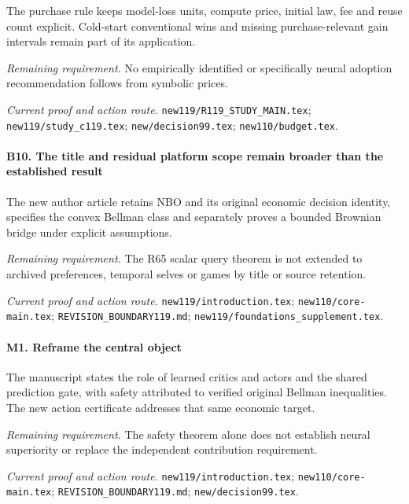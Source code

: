 The purchase rule keeps model-loss units, compute price, initial law, fee and reuse count explicit. Cold-start conventional wins and missing purchase-relevant gain intervals remain part of its application.

\par\emph{Remaining requirement.} No empirically identified or specifically neural adoption recommendation follows from symbolic prices.

\par\emph{Current proof and action route.} \nolinkurl{new119/R119_STUDY_MAIN.tex}; \nolinkurl{new119/study_c119.tex}; \nolinkurl{new/decision99.tex}; \nolinkurl{new110/budget.tex}.

\paragraph{B10. The title and residual platform scope remain broader than the established result}

The new author article retains NBO and its original economic decision identity, specifies the convex Bellman class and separately proves a bounded Brownian bridge under explicit assumptions.

\par\emph{Remaining requirement.} The R65 scalar query theorem is not extended to archived preferences, temporal selves or games by title or source retention.

\par\emph{Current proof and action route.} \nolinkurl{new119/introduction.tex}; \nolinkurl{new110/core-main.tex}; \nolinkurl{REVISION_BOUNDARY119.md}; \nolinkurl{new119/foundations_supplement.tex}.

\paragraph{M1. Reframe the central object}

The manuscript states the role of learned critics and actors and the shared prediction gate, with safety attributed to verified original Bellman inequalities. The new action certificate addresses that same economic target.

\par\emph{Remaining requirement.} The safety theorem alone does not establish neural superiority or replace the independent contribution requirement.

\par\emph{Current proof and action route.} \nolinkurl{new119/introduction.tex}; \nolinkurl{new110/core-main.tex}; \nolinkurl{REVISION_BOUNDARY119.md}; \nolinkurl{new/decision99.tex}.

